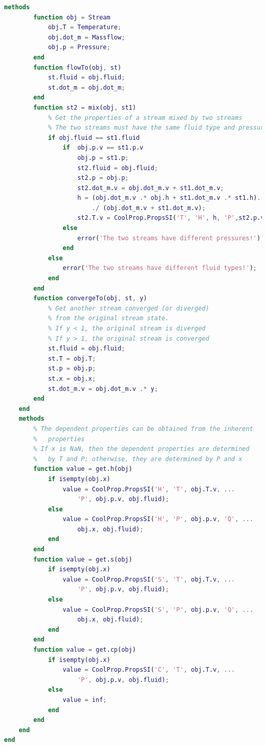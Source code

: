 \begin{lstlisting}[language= MATLAB, backgroundcolor = \color{yellow!20}, label = {lst:MATLAB_SOURCECODE}]
    methods
        function obj = Stream
            obj.T = Temperature;
            obj.dot_m = Massflow;
            obj.p = Pressure;
        end
        function flowTo(obj, st)
            st.fluid = obj.fluid;
            st.dot_m = obj.dot_m;
        end
        function st2 = mix(obj, st1)
            % Get the properties of a stream mixed by two streams
            % The two streams must have the same fluid type and pressure
            if obj.fluid == st1.fluid
                if  obj.p.v == st1.p.v
                    obj.p = st1.p;
                    st2.fluid = obj.fluid;
                    st2.p = obj.p;
                    st2.dot_m.v = obj.dot_m.v + st1.dot_m.v;
                    h = (obj.dot_m.v .* obj.h + st1.dot_m.v .* st1.h)...
                        ./ (obj.dot_m.v + st1.dot_m.v);
                    st2.T.v = CoolProp.PropsSI('T', 'H', h, 'P',st2.p.v);
                else
                    error('The two streams have different pressures!');
                end
            else
                error('The two streams have different fluid types!');
            end
        end
        function convergeTo(obj, st, y)
            % Get another stream converged (or diverged)
            % from the original stream state.
            % If y < 1, the original stream is diverged
            % If y > 1, the original stream is converged
            st.fluid = obj.fluid;
            st.T = obj.T;
            st.p = obj.p;
            st.x = obj.x;
            st.dot_m.v = obj.dot_m.v .* y;
        end
    end
    methods
        % The dependent properties can be obtained from the inherent
        %   properties
        % If x is NaN, then the dependent properties are determined
        %   by T and P; otherwise, they are determined by P and x
        function value = get.h(obj)
            if isempty(obj.x)
                value = CoolProp.PropsSI('H', 'T', obj.T.v, ...
                    'P', obj.p.v, obj.fluid);
            else
                value = CoolProp.PropsSI('H', 'P', obj.p.v, 'Q', ...
                    obj.x, obj.fluid);
            end
        end
        function value = get.s(obj)
            if isempty(obj.x)
                value = CoolProp.PropsSI('S', 'T', obj.T.v, ...
                    'P', obj.p.v, obj.fluid);
            else
                value = CoolProp.PropsSI('S', 'P', obj.p.v, 'Q', ...
                    obj.x, obj.fluid);
            end
        end
        function value = get.cp(obj)
            if isempty(obj.x)
                value = CoolProp.PropsSI('C', 'T', obj.T.v, ...
                    'P', obj.p.v, obj.fluid);
            else
                value = inf;
            end
        end
    end
end
\end{lstlisting}
  
